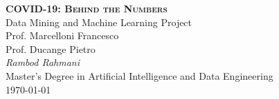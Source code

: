 \documentclass[11pt,a4paper]{article}
\begin{document}
\begin{center}
	\huge{\bfseries{\scshape{COVID-19: Behind the Numbers}}}\\
	\vspace{1.0cm}
	\large{Data Mining and Machine Learning Project}\\
	\vspace{0.2cm}
	\large{Prof. Marcelloni Francesco}\\
	\vspace{0.2cm}
	\large{Prof. Ducange Pietro}\\
	\vspace{1.0cm}
	\large\textit{Rambod Rahmani}\\
	\vspace{0.2cm}
	\scriptsize{Master's Degree in Artificial Intelligence and
	Data Engineering}\\
	\vspace{1.0cm}
	\normalsize{\today}
\end{center}

\tableofcontents

\end{document}
